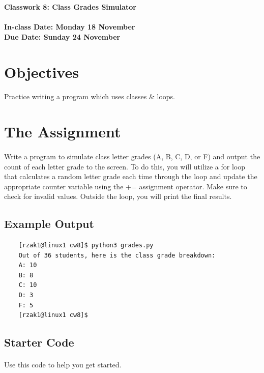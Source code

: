 \documentclass[letter,10pt]{article}
\begin{document}
    
    \huge
    \textbf{Classwork 8: Class Grades Simulator}
    \normalsize
    \\ ~~ \\
    \textbf{In-class Date: Monday 18 November} \\
    \textbf{Due Date: Sunday 24 November}
    
    \section*{Objectives}
    \paragraph{}Practice writing a program which uses classes \& loops.
    
    \section*{The Assignment}
    \paragraph{}Write a program to simulate class letter grades (A, B, C, D, or F) and output the count of each letter grade to the screen. To do this, you will utilize a for loop that calculates a random letter grade each time through the loop and update the appropriate counter variable using the += assignment operator. Make sure to check for invalid values. Outside the loop, you will print the final results.
    
    \subsection*{Example Output}
    \begin{verbatim}
    [rzak1@linux1 cw8]$ python3 grades.py
    Out of 36 students, here is the class grade breakdown:
    A: 10
    B: 8
    C: 10
    D: 3
    F: 5
    [rzak1@linux1 cw8]$ 
    \end{verbatim}
    
    \subsection*{Starter Code}
    \paragraph{}Use this code to help you get started.
    
\end{document}
